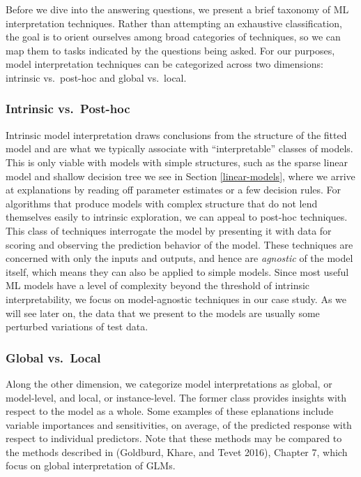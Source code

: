 \documentclass[preprint, 3p, twocolumn, letterpaper, 10pt]{elsarticle} %
\begin{document}
Before we dive into the answering questions, we present a brief taxonomy of ML
interpretation techniques. Rather than attempting an exhaustive classification,
the goal is to orient ourselves among broad categories of techniques, so we can
map them to tasks indicated by the questions being asked. For our purposes,
model interpretation techniques can be categorized across two dimensions:
intrinsic vs.~post-hoc and global vs.~local.

\hypertarget{intrinsic-vs.post-hoc}{%
\subsubsection{Intrinsic vs.~Post-hoc}\label{intrinsic-vs.post-hoc}}

Intrinsic model interpretation draws conclusions from the structure of the
fitted model and are what we typically associate with ``interpretable'' classes
of models. This is only viable with models with simple structures, such as the
sparse linear model and shallow decision tree we see in Section
\ref{linear-models}, where we arrive at explanations by reading off parameter
estimates or a few decision rules. For algorithms that produce models
with complex structure that do not lend themselves easily to intrinsic
exploration, we can appeal to post-hoc techniques. This class of techniques
interrogate the model by presenting it with data for scoring and observing the
prediction behavior of the model. These techniques are concerned with only the
inputs and outputs, and hence are \emph{agnostic} of the model itself, which means
they can also be applied to simple models. Since most useful ML models have a
level of complexity beyond the threshold of intrinsic interpretability, we focus
on model-agnostic techniques in our case study. As we will see later on, the
data that we present to the models are usually some perturbed variations of test
data.

\hypertarget{global-vs.local}{%
\subsubsection{Global vs.~Local}\label{global-vs.local}}

Along the other dimension, we categorize model interpretations as global, or
model-level, and local, or instance-level. The former class provides insights
with respect to the model as a whole. Some examples of these eplanations include
variable importances and sensitivities, on average, of the predicted response
with respect to individual predictors. Note that these methods may be compared to
the methods described in (Goldburd, Khare, and Tevet 2016), Chapter 7, which focus on global
interpretation of GLMs.
\end{document}
